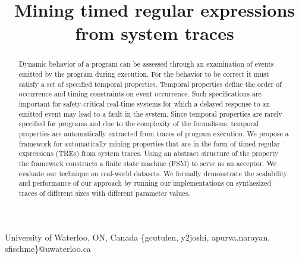\documentclass[]{sigplanconf}
\begin{document}
\title{Mining timed regular expressions from system traces}

		   {University of Waterloo, ON, Canada}
		   {\{gcutulen, y2joshi, apurva.narayan, sfischme\}@uwaterloo.ca}

\maketitle


\begin{abstract}

Dynamic behavior of a program can be assessed through an examination of events emitted by the program during execution. For the behavior to be correct it must satisfy a set of specified temporal properties. Temporal properties define the order of occurrence and timing constraints on event occurrence. Such specifications are important for safety-critical real-time systems for which a delayed response to an emitted event may lead to a fault in the system. Since temporal properties are rarely specified for programs and due to the complexity of the formalisms, temporal properties are automatically extracted from traces of program execution. We propose a framework for automatically mining properties that are in the form of timed regular expressions (TREs) from system traces. Using an abstract structure of the property the framework constructs a finite state machine (FSM) to serve as an acceptor. We evaluate our technique on real-world datasets. We formally demonstrate the scalability and performance of our approach by running our implementations on synthesized traces of different sizes with different parameter values.

\end{abstract}
\end{document}
